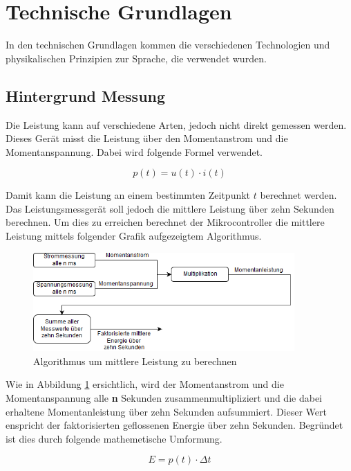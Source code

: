 \section{Technische Grundlagen}
In den technischen Grundlagen kommen die verschiedenen Technologien und physikalischen Prinzipien zur Sprache, die verwendet wurden. 
\subsection{Hintergrund Messung}%
Die Leistung kann auf verschiedene Arten, jedoch nicht direkt gemessen werden. Dieses Gerät misst die Leistung über den Momentanstrom und die Momentanspannung. Dabei wird folgende Formel verwendet.

\begin{equation}
	p(t) = u(t) \cdot i(t)
\end{equation}
\label{eq:Momentanleistung}

Damit kann die Leistung an einem bestimmten Zeitpunkt $t$ berechnet werden. Das Leistungsmessgerät soll jedoch die mittlere Leistung über zehn Sekunden berechnen. Um dies zu erreichen berechnet der Mikrocontroller die mittlere Leistung mittels folgender Grafik aufgezeigtem Algorithmus.
\begin{figure}[H]
\begin{center}
	\includegraphics[width=100mm]{images/messung_schematisch.png}
	\caption{Algorithmus um mittlere Leistung zu berechnen} %
	\label{fig:berechnung_P}
\end{center}
\end{figure}

Wie in Abbildung \ref{fig:berechnung_P} ersichtlich, wird der Momentanstrom und die Momentanspannung alle \textbf{n} Sekunden zusammenmultipliziert und die dabei erhaltene Momentanleistung über zehn Sekunden aufsummiert. Dieser Wert enspricht der faktorisierten geflossenen Energie über zehn Sekunden. Begründet ist dies durch folgende mathemetische Umformung.

\begin{equation}
	E = p(t) \cdot \Delta t
\end{equation}
\label{eq:energie1}


